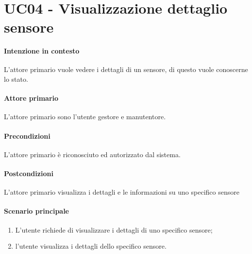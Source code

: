 \section{UC04 - Visualizzazione dettaglio sensore}\label{uc:04}
\paragraph{Intenzione in contesto} L'attore primario vuole vedere i dettagli di un sensore, di questo vuole conoscerne lo stato.
\paragraph{Attore primario} L'attore primario sono l'utente gestore e manutentore.
\paragraph{Precondizioni}L'attore primario è riconosciuto ed autorizzato dal sistema.
\paragraph{Postcondizioni} L'attore primario visualizza i dettagli e le informazioni su uno specifico sensore
\paragraph{Scenario principale}
\begin{enumerate}
    \item L'utente richiede di visualizzare i dettagli di uno specifico sensore;
    \item l'utente visualizza i dettagli dello specifico sensore.
\end{enumerate}